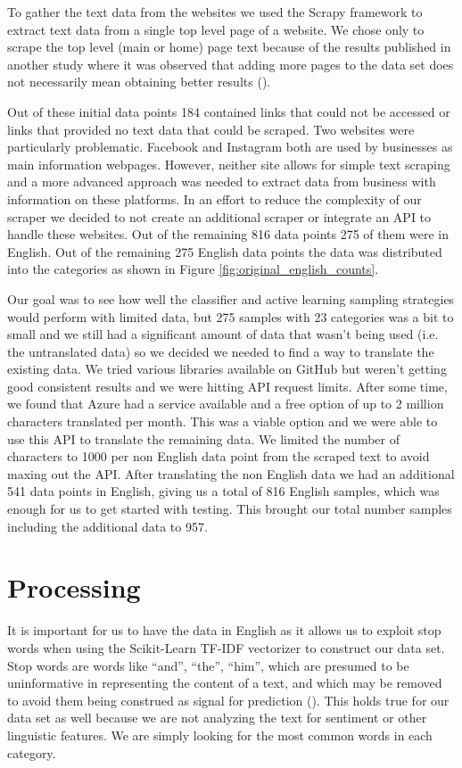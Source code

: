 To gather the text data from the websites we used the Scrapy framework to extract text data from a single top level page of a website. We chose only to scrape the top level (main or home) page text because of the results published in another study where it was observed that adding more pages to the data set does not necessarily mean obtaining better results (\cite{sahid2019ecommerce}). 

Out of these initial data points 184 contained links that could not be accessed or links that provided no text data that could be scraped. Two websites were particularly problematic. Facebook and Instagram both are used by businesses as main information webpages. However, neither site allows for simple text scraping and a more advanced approach was needed to extract data from business with information on these platforms. In an effort to reduce the complexity of our scraper we decided to not create an additional scraper or integrate an API to handle these websites. Out of the remaining 816 data points 275 of them were in English. Out of the remaining 275 English data points the data was distributed into the categories as shown in Figure \ref{fig:original_english_counts}.

Our goal was to see how well the classifier and active learning sampling strategies would perform with limited data, but 275 samples with 23 categories was a bit to small and we still had a significant amount of data that wasn't being used (i.e. the untranslated data) so we decided we needed to find a way to translate the existing data. We tried various libraries available on GitHub but weren't getting good consistent results and we were hitting API request limits. After some time, we found that Azure had a service available and a free option of up to 2 million characters translated per month. This was a viable option and we were able to use this API to translate the remaining data. We limited the number of characters to 1000 per non English data point from the scraped text to avoid maxing out the API. After translating the non English data we had an additional 541 data points in English, giving us a total of 816 English samples, which was enough for us to get started with testing. This brought our total number samples including the additional data to 957.

\section{Processing}

It is important for us to have the data in English as it allows us to exploit stop words when using the Scikit-Learn TF-IDF vectorizer to construct our data set. Stop words are words like “and”, “the”, “him”, which are presumed to be uninformative in representing the content of a text, and which may be removed to avoid them being construed as signal for prediction (\cite{sklearn62feature}). This holds true for our data set as well because we are not analyzing the text for sentiment or other linguistic features. We are simply looking for the most common words in each category.

